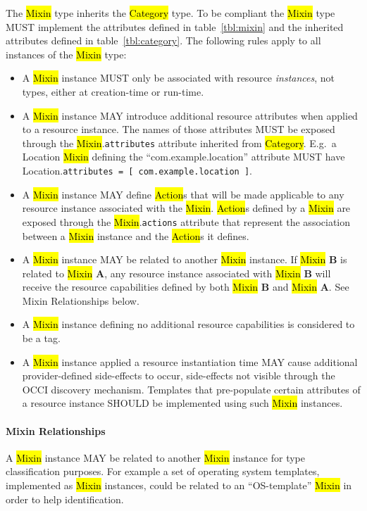 \documentclass[10pt,a4paper]{article}
\begin{document}
The \hl{Mixin} type inherits the \hl{Category} type. To be compliant
the \hl{Mixin} type MUST implement the attributes defined in
table~\ref{tbl:mixin} and the inherited attributes defined in
table~\ref{tbl:category}. The following rules apply to all instances
of the \hl{Mixin} type:
%
\begin{itemize}
  \item A \hl{Mixin} instance MUST only be associated with resource
    {\em instances}, not types, either at creation-time or run-time.
  \item A \hl{Mixin} instance MAY introduce additional resource
    attributes when applied to a resource instance. The names of those
    attributes MUST be exposed through the \hl{Mixin}.{\tt attributes}
    attribute inherited from \hl{Category}.  E.g.~a Location
    \hl{Mixin} defining the ``com.example.location'' attribute MUST
    have Location.{\tt attributes = [ com.example.location ]}.
  \item A \hl{Mixin} instance MAY define \hl{Action}s that will be
    made applicable to any resource instance associated with the
    \hl{Mixin}.  \hl{Action}s defined by a \hl{Mixin} are exposed
    through the \hl{Mixin}.{\tt actions} attribute that represent the
    association between a \hl{Mixin} instance and the \hl{Action}s it
    defines.
  \item A \hl{Mixin} instance MAY be related to another \hl{Mixin}
    instance.  If \hl{Mixin} {\bf B} is related to \hl{Mixin} {\bf A},
    any resource instance associated with \hl{Mixin} {\bf B} will
    receive the resource capabilities defined by both \hl{Mixin} {\bf
      B} and \hl{Mixin} {\bf A}.  See Mixin Relationships below.
  \item A \hl{Mixin} instance defining no additional resource
    capabilities is considered to be a tag.
  \item A \hl{Mixin} instance applied a resource instantiation time
    MAY cause additional provider-defined side-effects to occur,
    side-effects not visible through the OCCI discovery
    mechanism. Templates that pre-populate certain attributes of a
    resource instance SHOULD be implemented using such \hl{Mixin}
    instances.
\end{itemize}

\paragraph*{Mixin Relationships}

A \hl{Mixin} instance MAY be related to another \hl{Mixin} instance
for type classification purposes. For example a set of operating
system templates, implemented as \hl{Mixin} instances, could be
related to an ``OS-template'' \hl{Mixin} in order to help
identification.
\end{document}
